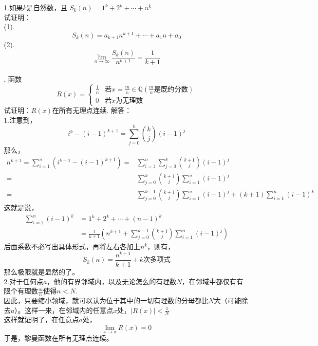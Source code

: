 \documentclass[11pt,a4paper,openany]{article}
\begin{document}
\noindent 1.如果$k$是自然数，且
$S_k(n)=1^k+2^k+\cdots+n^k$\\
试证明：\\
(1).
\[
S_k(n)=a_{k+1}n^{k+1}+\cdots+a_1 n+a_0
\]
(2).
\[
\lim_{n\rightarrow\infty}
\frac{S_k(n)}{n^{k+1}}
=\frac{1}{k+1}
\]
\\
.
函数
\[R(x)=\left\{
\begin{array}{ll}
\frac{1}{n}&\text{若}x=\frac{m}{n}\in \mathbb{Q}(\frac{m}{n}\text{是既约分数})\\
0&\text{若}x \text{为无理数}
\end{array}
\right .
\]
试证明：$R(x)$在所有无理点连续.
\newpage
解答：\\
1.注意到，
\[
i^{k}-(i-1)^{k+1}
=\sum_{j=0}^{k}{k \choose j}(i-1)^{j}
\]
那么，
\[
\begin{split}
n^{k+1}=\sum^{n}_{i=1}\left(i^{k+1}-(i-1)^{k+1}\right)
=&\sum^{n}_{i=1}\sum_{j=0}^{k}{k +1\choose j}(i-1)^{j}\\
=&\sum_{j=0}^{k}{k+1 \choose j}\sum^{n}_{i=1}(i-1)^{j}\\
=&\sum_{j=0}^{k-1}{k+1 \choose j}\sum^{n}_{i=1}(i-1)^j
+(k+1)\sum^{n}_{i=1}(i-1)^{k}
\end{split}
\]
这就是说，
\[
\begin{split}
\sum^{n}_{i=1}(i-1)^{k}&=1^k+2^k
+\cdots+(n-1)^k\\
&=
\frac{1}{k+1}\left(n^{k+1}+\sum_{j=0}^{k-1}{k+1 \choose j}\sum^{n}_{i=1}(i-1)^j\right)
\end{split}
\]
后面系数不必写出具体形式，再将左右各加上$n^k$，则有，
\[
S_k(n)=\frac{n^{k+1}}{k+1}+k\text{次多项式}
\]
那么极限就是显然的了。
\\
2.对于任何点$a$，他的有界邻域内，以及无论怎么的有理数$N$，在邻域中都仅有有限个有理数$\displaystyle{\frac{m}{n}}$使得$n<N$.\\
\indent 因此，只要缩小领域，就可以认为位于其中的一切有理数的分母都比$N$大（可能除去$a$）。这样一来，在邻域内的任意点$x$处，$\displaystyle{|R(x)|<\frac{1}{N}}$\\
\indent 这样就证明了，在任意点$a$处，
\[
\lim_{x\rightarrow a}R(x)=0
\]
于是，黎曼函数在所有无理点连续。
\end{document}
